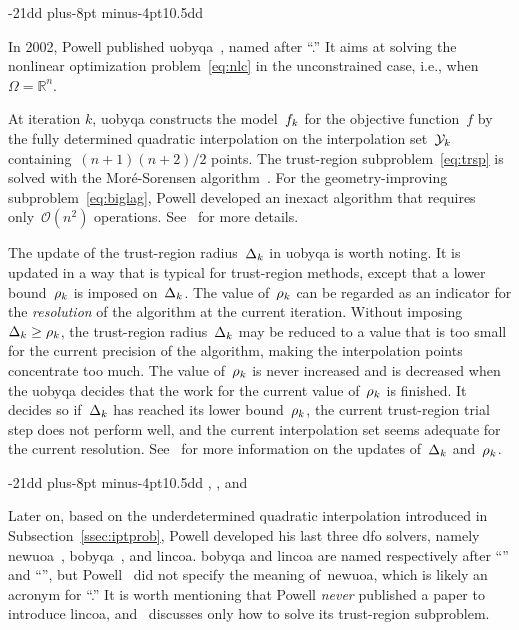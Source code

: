 \documentclass[
    smallextended,  %
    final,          %
]{svjour3}
\makeatletter
\newcommand{\R}{\mathbb{R}}
\newcommand{\fset}{\Omega}
\newcommand{\objm}[1][k]{\obj\ifthenelse{\equal{#1}{}}{}{_{#1}}}
\newcommand{\obj}{f}
\newcommand{\rad}[1][k]{\Delta\ifthenelse{\equal{#1}{}}{}{_{#1}}}
\newcommand{\radlb}[1][k]{\rho\ifthenelse{\equal{#1}{}}{}{_{#1}}}
\newcommand{\xpt}[1][k]{\mathcal{Y}\ifthenelse{\equal{#1}{}}{}{_{#1}}}
\def\subsection{\@startsection{subsection}{2}{\z@}%
    {-21dd plus-8pt minus-4pt}{10.5dd}
     {\normalsize\bfseries}}
\makeatother
\begin{document}
\subsection{}
\label{ssec:uobyqa}

In 2002, Powell published \gls{uobyqa}~\cite{Powell_2002}, named after ``.''
It aims at solving the nonlinear optimization problem~\eqref{eq:nlc} in the unconstrained case, i.e., when~$\fset = \R^n$.


At iteration $k$, \gls{uobyqa} constructs the model~$\objm$ for the objective function~$\obj$
by the fully determined quadratic interpolation on the interpolation set~$\xpt$ containing~$(n + 1)(n + 2) / 2$ points.
The trust-region subproblem~\eqref{eq:trsp} is solved with the Mor{\'{e}}-Sorensen algorithm~\cite{More_Sorensen_1983}.
For the geometry-improving subproblem~\eqref{eq:biglag}, Powell developed an inexact algorithm that requires only~$\mathcal{O}(n^2)$
operations. See~\cite[\S~2]{Powell_2002} for more details.

The update of the trust-region radius~$\rad$ in \gls{uobyqa} is worth noting.
It is updated in a way that is typical for trust-region methods, except that a  lower
bound~$\radlb$ is imposed on~$\rad$.
The value of~$\radlb[k]$ can be regarded as an indicator for the \emph{resolution} of the algorithm at the current iteration.
Without imposing~$\rad[k] \ge \radlb[k]$, the trust-region radius~$\rad[k]$ may be reduced to a
value that is too small for the current precision of the algorithm, making the interpolation points
concentrate too much.
The value of~$\radlb[k]$ is never increased and is decreased when the \gls{uobyqa} decides that the work for the current value of~$\radlb[k]$ is finished.
It decides so if~$\rad[k]$ has reached its lower bound~$\radlb[k]$,
the current trust-region trial step does not perform well,
and the current interpolation set seems adequate for the current resolution.
See~\cite[\S~3]{Powell_2002} for more information on the updates of~$\rad$ and~$\radlb[k]$.


\subsection{, , and }
\label{ssec:nbloa}

Later on, based on the underdetermined quadratic interpolation introduced in Subsection~\ref{ssec:iptprob},
Powell developed his last three \gls{dfo} solvers, namely \gls{newuoa}~\cite{Powell_2006,Powell_2008}, \gls{bobyqa}~\cite{Powell_2009}, and \gls{lincoa}.
\gls{bobyqa} and \gls{lincoa} are named respectively after ``'' and
``'', but Powell~\cite{Powell_2006,Powell_2008} did not specify the meaning
of~\gls{newuoa}, which is likely an acronym for ``.''
It is worth mentioning that Powell \emph{never} published a paper to introduce \gls{lincoa},
and~\cite{Powell_2015} discusses only how to solve its trust-region subproblem.
\end{document}
